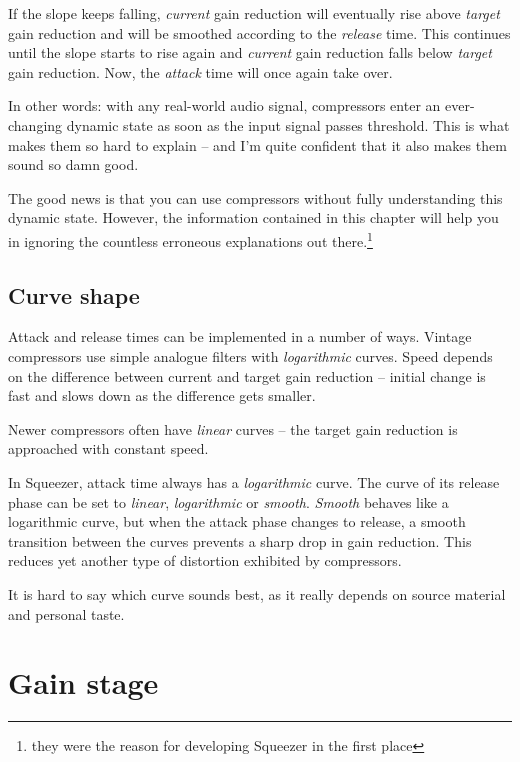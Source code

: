 If the slope keeps falling, \emph{current} gain reduction will
eventually rise above \emph{target} gain reduction and will be
smoothed according to the \emph{release} time.  This continues until
the slope starts to rise again and \emph{current} gain reduction falls
below \emph{target} gain reduction.  Now, the \emph{attack} time will
once again take over.

In other words: with any real-world audio signal, compressors enter an
ever-changing dynamic state as soon as the input signal passes
threshold.  This is what makes them so hard to explain -- and I'm
quite confident that it also makes them sound so damn good.

The good news is that you can use compressors without fully
understanding this dynamic state.  However, the information contained
in this chapter will help you in ignoring the countless erroneous
explanations out there.\footnote{they were the reason for developing
  Squeezer in the first place}

\subsection{Curve shape}
\label{sec:curve_shape}

Attack and release times can be implemented in a number of ways.
Vintage compressors use simple analogue filters with
\emph{logarithmic} curves.  Speed depends on the difference between
current and target gain reduction -- initial change is fast and slows
down as the difference gets smaller.

Newer compressors often have \emph{linear} curves -- the target gain
reduction is approached with constant speed.

In Squeezer, attack time always has a \emph{logarithmic} curve.  The
curve of its release phase can be set to \emph{linear},
\emph{logarithmic} or \emph{smooth}.  \emph{Smooth} behaves like a
logarithmic curve, but when the attack phase changes to release, a
smooth transition between the curves prevents a sharp drop in gain
reduction.  This reduces yet another type of distortion exhibited by
compressors.

It is hard to say which curve sounds best, as it really depends on
source material and personal taste.

\section{Gain stage}
\label{sec:gain_stage}

